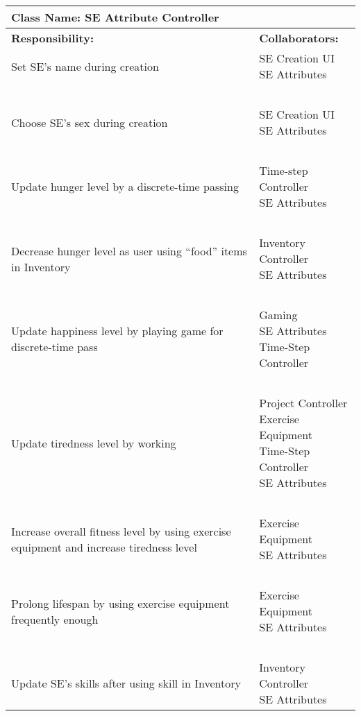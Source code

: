\documentclass[]{article}
\begin{document}
\begin{table}[H]
    \centering
    \begin{tabular}{|p{7.5cm}|p{7.5cm}|}
        \hline
        \multicolumn{2}{|l|}{\textbf{Class Name:} SE Attribute Controller}\\
        \hline
        \textbf{Responsibility:} & \textbf{Collaborators:}\\
        \hline
        Set SE’s name during creation & \makecell[l]{SE Creation UI\\SE Attributes}\\
        ~ & ~\\
        Choose SE’s sex during creation & \makecell[l]{SE Creation UI\\SE Attributes}\\
        ~ & ~\\
        Update hunger level by a discrete-time passing & \makecell[l]{Time-step Controller\\SE Attributes}\\
        ~ & ~\\
        Decrease hunger level as user using “food” items in Inventory & \makecell[l]{Inventory Controller\\SE Attributes}\\
        ~ & ~\\
        Update happiness level by playing game for discrete-time pass & \makecell[l]{Gaming\\SE Attributes\\Time-Step Controller}\\
        ~ & ~\\
        Update tiredness level by working & \makecell[l]{Project Controller\\Exercise Equipment\\Time-Step Controller\\SE Attributes}\\
        ~ & ~\\
        Increase overall fitness level by using exercise equipment and increase tiredness level & \makecell[l]{Exercise Equipment\\SE Attributes}\\
        ~ & ~\\
        Prolong lifespan by using exercise equipment frequently enough & \makecell[l]{Exercise Equipment\\SE Attributes}\\
        ~ & ~\\
        Update SE’s skills after using skill in Inventory & \makecell[l]{Inventory Controller\\SE Attributes}\\

\end{tabular}
\end{table}
\end{document}
